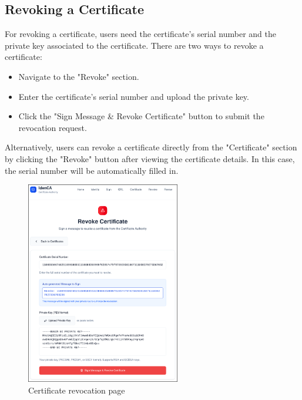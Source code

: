 \subsection{Revoking a Certificate}
For revoking a certificate, users need the certificate's serial number and the private key 
associated to the certificate. There are two ways to revoke a certificate:
\begin{itemize}
    \item Navigate to the "Revoke" section.
    \item Enter the certificate's serial number and upload the private key.
    \item Click the "Sign Message \& Revoke Certificate" button to submit the revocation request.
\end{itemize}
Alternatively, users can revoke a certificate directly from the "Certificate" section by 
clicking the "Revoke" button after viewing the certificate details.
In this case, the serial number will be automatically filled in.
\begin{figure}[h!]
    \centering
    \includegraphics[keepaspectratio, width=0.6\textwidth]{Pic/9_revoke_certificate.png}
    \caption{Certificate revocation page}
    \label{fig:revocation-flow}
\end{figure}

